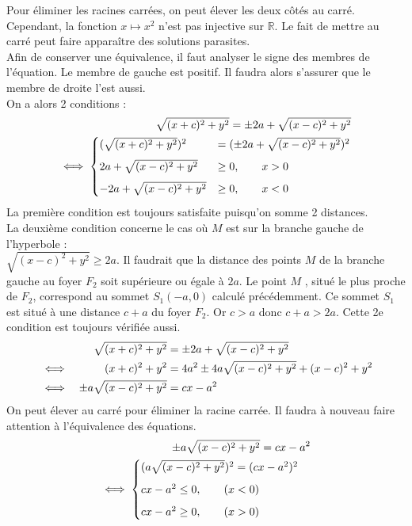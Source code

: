 \begin{eleve}
Pour éliminer les racines carrées, on peut élever les deux côtés au carré. 
Cependant, la fonction $x \mapsto  x^2$ n'est pas injective sur $\mathbb{R}$. 
Le fait de mettre au carré peut faire apparaître des solutions parasites.\\
Afin de conserver une équivalence, il faut analyser le signe des membres de l'équation. 
Le membre de gauche est positif. 
Il faudra alors s'assurer que le membre de droite l'est aussi.\\
On a alors 2 conditions :
\begin{align*}
\sqrt{(x+c)^2 + y^2} =  \pm 2a + \sqrt{(x-c)^2 + y^2} \notag\\
\iff
\begin{cases}
(\sqrt{(x+c)^2 + y^2})^2 &= (\pm 2a +\sqrt{(x-c)^2 + y^2})^2\\[2mm]
2a + \sqrt{(x-c)^2 + y^2} &\geq 0, \qquad x>0 \\[2mm]
-2a + \sqrt{(x-c)^2 + y^2} &\geq 0, \qquad x<0
\end{cases}
\end{align*}
La première condition est toujours satisfaite puisqu'on somme 2 distances.\\
La deuxième condition concerne le cas où $M$ est sur la 
branche gauche de l'hyperbole : \\
$\sqrt{(x-c)^2 + y^2}\geq 2a$. Il faudrait que la 
distance des points $M$ de la branche gauche au foyer $F_2$ soit supérieure ou égale à $2a$.
Le point $M$ , situé le plus proche de $F_2$, correspond au sommet $S_1(-a,0)$ calculé précédemment.
Ce sommet $S_1$ est situé à une distance $c+a$ du foyer $F_2$. Or $c>a$ donc $c+a > 2a$. 
Cette 2e condition est toujours vérifiée aussi.
\begin{align*}
    & & \sqrt{(x+c)^2 + y^2} &= \pm 2a + \sqrt{(x-c)^2 + y^2} \notag\\
&\iff&(x+c)^2 + y^2 &= 4a^2 \pm 4a\sqrt{(x-c)^2 + y^2}+ (x-c)^2 + y^2\\
&\iff& \pm a\sqrt{(x-c)^2 + y^2} &= cx - a^2
\end{align*}
On peut élever au carré pour éliminer la racine carrée. Il faudra à nouveau faire attention à l'équivalence 
des équations.
\begin{align*}
 \pm a\sqrt{(x-c)^2 + y^2} = cx - a^2 \notag\\
    \iff \begin{cases}
        (a\sqrt{(x-c)^2 + y^2})^2 = (cx - a^2)^2\\[2mm]
    cx - a^2\leq0, \qquad (x<0)\\[2mm]
    cx - a^2\geq0, \qquad (x>0)
    \end{cases}
\end{align*}


\end{eleve}
